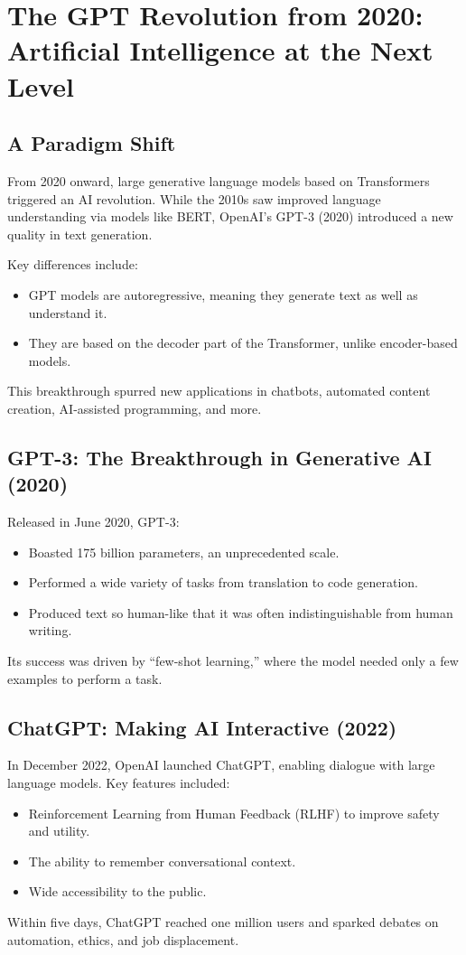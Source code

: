 \section{The GPT Revolution from 2020: Artificial Intelligence at the Next Level}

\subsection{A Paradigm Shift}

From 2020 onward, large generative language models based on Transformers triggered an AI
revolution. While the 2010s saw improved language understanding via models like BERT,
OpenAI’s GPT-3 (2020) introduced a new quality in text generation.

Key differences include:
\begin{itemize}
  \item GPT models are autoregressive, meaning they generate text as well as understand it.
  \item They are based on the decoder part of the Transformer, unlike encoder-based models.
\end{itemize}

This breakthrough spurred new applications in chatbots, automated content creation,
AI-assisted programming, and more.

\subsection{GPT-3: The Breakthrough in Generative AI (2020)}

Released in June 2020, GPT-3:
\begin{itemize}
  \item Boasted 175 billion parameters, an unprecedented scale.
  \item Performed a wide variety of tasks from translation to code generation.
  \item Produced text so human-like that it was often indistinguishable from human writing.
\end{itemize}
Its success was driven by “few-shot learning,” where the model needed only a few examples
to perform a task.

\subsection{ChatGPT: Making AI Interactive (2022)}

In December 2022, OpenAI launched ChatGPT, enabling dialogue with large language models.
Key features included:
\begin{itemize}
  \item Reinforcement Learning from Human Feedback (RLHF) to improve safety and utility.
  \item The ability to remember conversational context.
  \item Wide accessibility to the public.
\end{itemize}
Within five days, ChatGPT reached one million users and sparked debates on automation,
ethics, and job displacement.

